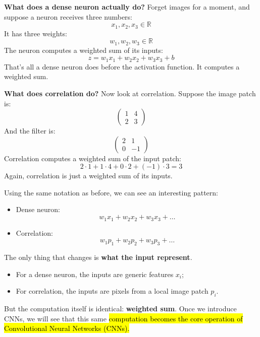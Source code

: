 \highspace
\textcolor{Green3}{ \textbf{What does a dense neuron actually do?}} Forget images for a moment, and suppose a neuron receives three numbers:
\begin{equation*}
    x_1, x_2, x_3 \in \mathbb{R}
\end{equation*}
It has three weights:
\begin{equation*}
    w_1, w_2, w_3 \in \mathbb{R}
\end{equation*}
The neuron computes a weighted sum of its inputs:
\begin{equation*}
    z = w_1 x_1 + w_2 x_2 + w_3 x_3 + b
\end{equation*}
That's all a dense neuron does before the activation function. It computes a weighted sum.

\highspace
\textcolor{Green3}{ \textbf{What does correlation do?}} Now look at correlation. Suppose the image patch is:
\begin{equation*}
    \begin{pmatrix}
        1 & 4 \\
        2 & 3
    \end{pmatrix}
\end{equation*}
And the filter is:
\begin{equation*}
    \begin{pmatrix}
        2 & 1 \\
        0 & -1
    \end{pmatrix}
\end{equation*}
Correlation computes a weighted sum of the input patch:
\begin{equation*}
    2 \cdot 1 + 1 \cdot 4 + 0 \cdot 2 + (-1) \cdot 3 = 3
\end{equation*}
Again, correlation is just a weighted sum of its inputs.

\highspace
Using the same notation as before, we can see an interesting pattern:
\begin{itemize}
    \item Dense neuron:
    \begin{equation*}
        w_1 x_1 + w_2 x_2 + w_3 x_3 + \dots
    \end{equation*}
    \item Correlation:
    \begin{equation*}
        w_1 p_1 + w_2 p_2 + w_3 p_3 + \dots
    \end{equation*}
\end{itemize}
The only thing that changes is \textbf{what the input represent}.
\begin{itemize}
    \item For a dense neuron, the inputs are generic features $x_i$;
    \item For correlation, the inputs are pixels from a local image patch $p_i$.
\end{itemize}
But the computation itself is identical: \textbf{weighted sum}. Once we introduce CNNs, we will see that this same \hl{computation becomes the core operation of Convolutional Neural Networks (CNNs).}

